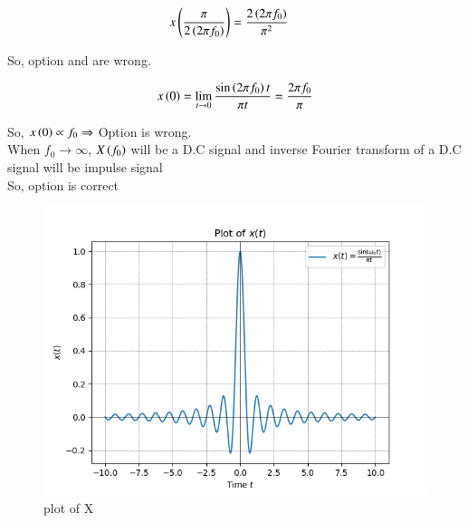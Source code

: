 \documentclass[beamer]{IEEEtran}
\theoremstyle{remark}
\begin{document}
\begin{align}
& x\left(\frac{\pi}{2\left(2\pi f_{0}\right)}\right) =\frac{2 \left(2\pi f_{0}\right)}{\pi^2}
\end{align}

So, option  and  are wrong.

\begin{align}
x\left(0\right)=\lim_{t\to 0}\frac{\sin \left(2\pi f_{0}\right) t}{\pi t}=\frac{2\pi f_{0}}{\pi}
\end{align}

So, $x\left(0\right) \propto f_{0} \Rightarrow$ Option  is wrong.\\

When $f_{0}\rightarrow \infty$, $X\left(f_{0}\right)$ will be a D.C signal and inverse Fourier transform of a D.C signal will be impulse signal\\[3ex]
So, option  is correct
\begin{figure}[ht]
    \centering
    \includegraphics[width=1\columnwidth]{figs/main.png}
    \caption{plot of X}
    \label{fig:enter-label}
\end{figure}
\end{document}

